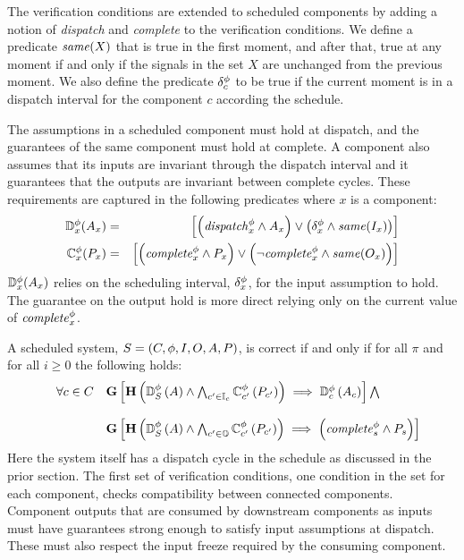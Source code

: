 The verification conditions are extended to scheduled components by adding a notion of \textit{dispatch} and \textit{complete} to the verification conditions.
We define a predicate $\mathit{same}(X)$ that is true in the first moment, and after that, true at any moment if and only if the signals in the set $X$ are unchanged from the previous moment.
We also define the predicate $\delta^\phi_c$ to be true if the current moment is in a dispatch interval for the component $c$ according the schedule.

The assumptions in a scheduled component must hold at dispatch, and the guarantees of the same component must hold at complete.
A component also assumes that its inputs are invariant through the dispatch interval and it guarantees that the outputs are invariant between complete cycles.
These requirements are captured in the following predicates where $x$ is a component:
\begin{eqnarray*}
  \mathbb{D}^\phi_x(A_x) &=& \left[\left(\mathit{dispatch}^{\phi}_x \wedge A_x\right) \vee \left(\delta^\phi_x \wedge \mathit{same}(I_x)\right)\right] \\
  \mathbb{C}^\phi_x(P_x) &=& \left[\left(\mathit{complete}^{\phi}_x \wedge P_x\right) \vee \left(\neg\mathit{complete}^{\phi}_x \wedge \mathit{same}(O_x)\right)\right] \\
\end{eqnarray*}
$\mathbb{D}^\phi_x(A_x)$ relies on the scheduling interval, $\delta^\phi_x$, for the input assumption to hold.
The guarantee on the output hold is more direct relying only on the current value of $\mathit{complete}^{\phi}_x$.

A scheduled system, $S = (C, \phi, I, O, A, P)$, is correct if and only if for all $\pi$ and for all $i \ge 0$ the following holds:
\[
\begin{array}{lll}
        & \forall c \in C &  
            \mathbf{G}\left[\mathbf{H}\left(\mathbb{D}^\phi_S\left(A\right) \wedge 
            \bigwedge_{c^\prime \in \mathbb{I}_c} \mathbb{C}^\phi_{c^\prime}\left(P_{c^\prime}\right)\right) 
            \implies \mathbb{D}^\phi_c\left(A_c\right)\right] \bigwedge \\ \\
  &   & 
            \mathbf{G}\left[\mathbf{H}\left(\mathbb{D}^\phi_S\left(A\right) \wedge 
            \bigwedge_{c^\prime \in \mathbb{O}} \mathbb{C}^\phi_{c^\prime}\left(P_{c^\prime}\right)\right)
            \implies \left(\mathit{complete}^{\phi}_s \wedge P_s\right)\right]
\end{array}
\]
Here the system itself has a dispatch cycle in the schedule as discussed in the prior section.
The first set of verification conditions, one condition in the set for each component, checks compatibility between connected components.
Component outputs that are consumed by downstream components as inputs must have guarantees strong enough to satisfy input assumptions at dispatch.
These must also respect the input freeze required by the consuming component.

